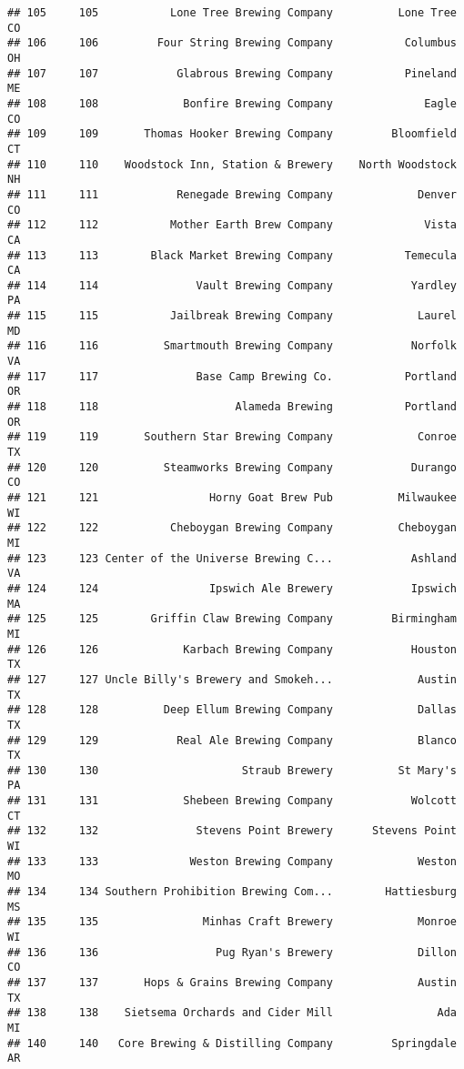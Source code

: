 \documentclass[
]{article}
\begin{document}
\begin{verbatim}
## 105     105           Lone Tree Brewing Company          Lone Tree    CO
## 106     106         Four String Brewing Company           Columbus    OH
## 107     107            Glabrous Brewing Company           Pineland    ME
## 108     108             Bonfire Brewing Company              Eagle    CO
## 109     109       Thomas Hooker Brewing Company         Bloomfield    CT
## 110     110    Woodstock Inn, Station & Brewery    North Woodstock    NH
## 111     111            Renegade Brewing Company             Denver    CO
## 112     112           Mother Earth Brew Company              Vista    CA
## 113     113        Black Market Brewing Company           Temecula    CA
## 114     114               Vault Brewing Company            Yardley    PA
## 115     115           Jailbreak Brewing Company             Laurel    MD
## 116     116          Smartmouth Brewing Company            Norfolk    VA
## 117     117               Base Camp Brewing Co.           Portland    OR
## 118     118                     Alameda Brewing           Portland    OR
## 119     119       Southern Star Brewing Company             Conroe    TX
## 120     120          Steamworks Brewing Company            Durango    CO
## 121     121                 Horny Goat Brew Pub          Milwaukee    WI
## 122     122           Cheboygan Brewing Company          Cheboygan    MI
## 123     123 Center of the Universe Brewing C...            Ashland    VA
## 124     124                 Ipswich Ale Brewery            Ipswich    MA
## 125     125        Griffin Claw Brewing Company         Birmingham    MI
## 126     126             Karbach Brewing Company            Houston    TX
## 127     127 Uncle Billy's Brewery and Smokeh...             Austin    TX
## 128     128          Deep Ellum Brewing Company             Dallas    TX
## 129     129            Real Ale Brewing Company             Blanco    TX
## 130     130                      Straub Brewery          St Mary's    PA
## 131     131             Shebeen Brewing Company            Wolcott    CT
## 132     132               Stevens Point Brewery      Stevens Point    WI
## 133     133              Weston Brewing Company             Weston    MO
## 134     134 Southern Prohibition Brewing Com...        Hattiesburg    MS
## 135     135                Minhas Craft Brewery             Monroe    WI
## 136     136                  Pug Ryan's Brewery             Dillon    CO
## 137     137       Hops & Grains Brewing Company             Austin    TX
## 138     138    Sietsema Orchards and Cider Mill                Ada    MI
## 140     140   Core Brewing & Distilling Company         Springdale    AR

\end{verbatim}
\end{document}
